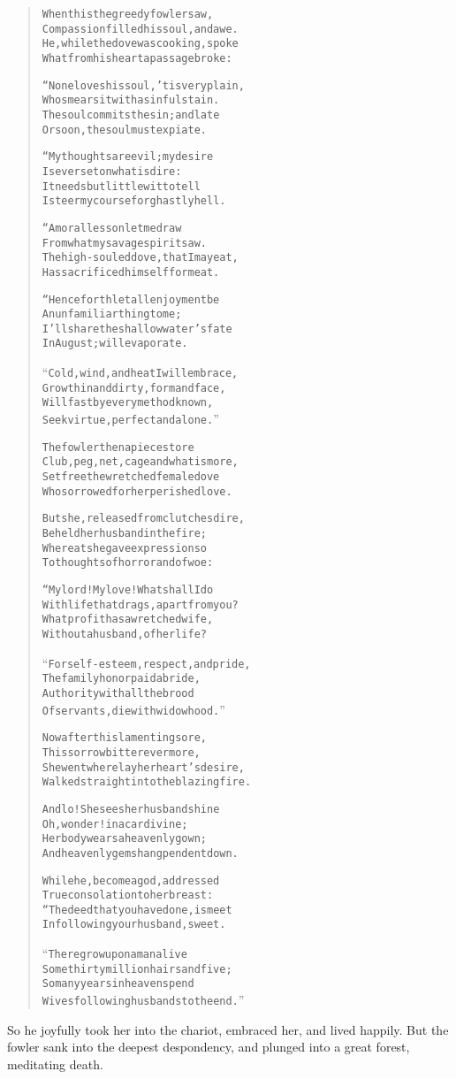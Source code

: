 \documentclass[article, twoside, 14pt]{memoir}
\renewenvironment{verbatim}{%
\begin{quote}%
\vskip -10pt%
\begin{alltt}\normalfont\large}{\end{alltt}%
\end{quote}%
\vskip -10pt
} %
\begin{document}
\begin{verbatim}
When this the greedy fowler saw,
Compassion filled his soul, and awe.
He, while the dove was cooking, spoke
What from his heart a passage broke:

“None loves his soul, 'tis very plain,
Who smears it with a sinful stain.
The soul commits the sin; and late
Or soon, the soul must expiate.

“My thoughts are evil; my desire
Is ever set on what is dire:
It needs but little wit to tell
I steer my course for ghastly hell.

“A moral lesson let me draw
From what my savage spirit saw.
The high-souled dove, that I may eat,
Has sacrificed himself for meat.

“Henceforth let all enjoyment be
An unfamiliar thing to me;
I'll share the shallow water's fate
In August; will evaporate.

“Cold, wind, and heat I will embrace,
Grow thin and dirty, form and face,
Will fast by every method known,
Seek virtue, perfect and alone.”

The fowler then apieces tore
Club, peg, net, cage{\textemdash}and what is more,
Set free the wretched female dove
Who sorrowed for her perished love.

But she, released from clutches dire,
Beheld her husband in the fire;
Whereat she gave expression so
To thoughts of horror and of woe:

“My lord! My love! What shall I do
With life that drags, apart from you?
What profit has a wretched wife,
Without a husband, of her life?

“For self-esteem, respect, and pride,
The family honor paid a bride,
Authority with all the brood
Of servants, die with widowhood.”

Now after this lamenting sore,
This sorrow bitter evermore,
She went where lay her heart's desire,
Walked straight into the blazing fire.

And lo! She sees her husband shine{\textemdash}
Oh, wonder!{\textemdash}in a car divine;
Her body wears a heavenly gown;
And heavenly gems hang pendent down.

While he, become a god, addressed
True consolation to her breast:
“The deed that you have done, is meet
In following your husband, sweet.

“There grow upon a man alive
Some thirty million hairs and five;
So many years in heaven spend
Wives following husbands to the end.”
\end{verbatim}
So he joyfully took her into the chariot, embraced her, and lived
happily. But the fowler sank into the deepest despondency, and
plunged into a great forest, meditating death.
\end{document}
